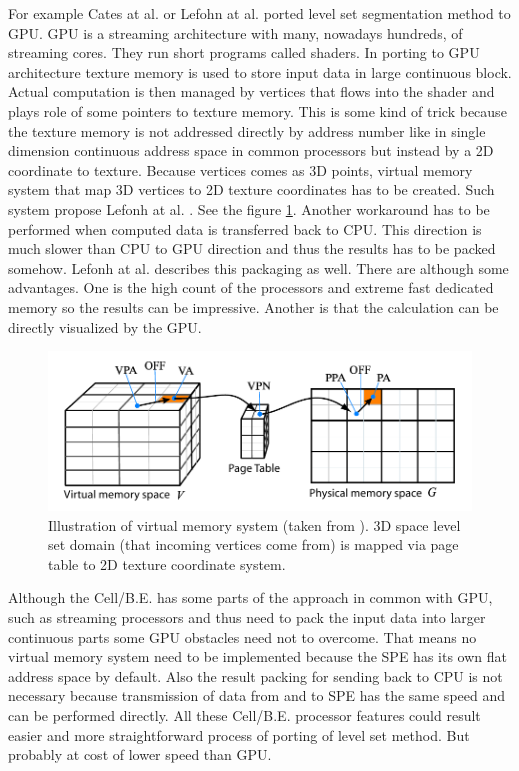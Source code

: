 \par
For example Cates at al. \cite{GIST} or Lefohn at al. \cite{lefonhGPUSolver} ported level set segmentation method to GPU.
GPU is a streaming architecture with many, nowadays hundreds, of streaming cores. They run short programs called shaders.
In porting to GPU architecture texture memory is used to store input data in large continuous block.
Actual computation is then managed by vertices that flows into the shader and plays role of some pointers to texture memory.
This is some kind of trick because the texture memory is not addressed directly by address number like in single dimension continuous address space in common processors but instead by a 2D coordinate to texture.
Because vertices comes as 3D points, virtual memory system that map 3D vertices to 2D texture coordinates has to be created.
Such system propose Lefonh at al. \cite{lefonhGPUSolver}. See the figure \ref{fg:virtual memory on GPU}.
Another workaround has to be performed when computed data is transferred back to CPU.
This direction is much slower than CPU to GPU direction and thus the results has to be packed somehow.
Lefonh at al. \cite{lefonhGPUSolver} describes this packaging as well.
There are although some advantages.
One is the high count of the processors and extreme fast dedicated memory so the results can be impressive.
Another is that the calculation can be directly visualized by the GPU.

\begin{figure}
    \centering
    \includegraphics[width=\textwidth]{data/png/gpuVirtMemory}
    \caption[GPU virtual memory]{Illustration of virtual memory system (taken from \cite{lefonhGPUSolver}). 3D space level set domain (that incoming vertices come from) is mapped via page table to 2D texture coordinate system.}
    \label{fg:virtual memory on GPU}
\end{figure}

\par
Although the \mbox{Cell/B.E.} has some parts of the approach in common with GPU, such as streaming processors and thus need to pack the input data into larger continuous parts some GPU obstacles need not to overcome.
That means no virtual memory system need to be implemented because the SPE has its own flat address space by default.
Also the result packing for sending back to CPU is not necessary because transmission of data from and to SPE has the same speed and can be performed directly.
All these \mbox{Cell/B.E.} processor features could result easier and more straightforward process of porting of level set method.
But probably at cost of lower speed than GPU.
